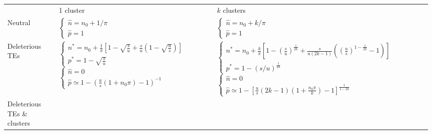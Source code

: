 \documentclass[10pt,a4paper]{article}
\begin{document}
\begin{table}
\begin{adjustwidth}{-2in}{0in}
\begin{flushright}
\begin{tabular}{p{3cm}p{6cm}p{7cm}}
 & 1 cluster & $k$ clusters \\
Neutral						& $\begin{cases} 
								\hat n = n_0 + 1/\pi \\ 
								\hat p = 1 
							\end{cases}$
							& $\begin{cases} 
								\hat n = n_0 + k/\pi \\ 
								\hat p = 1 
							\end{cases}$  \\
Deleterious TEs 			& $\begin{cases} 
								n^\ast = n_0 + \frac{1}{\pi}[1-\sqrt{\frac{s}{u}}+ \frac{s}{u}(1-\sqrt{\frac{u}{s}})] \\
								p^\ast = 1 - \sqrt{\frac{s}{u}} 
							\end{cases}$ 
							$\begin{cases}
								\hat n = 0 \\ 
								\hat p \simeq 1-(\frac{u}{s}(1+n_0\pi)-1)^{-1} 
							\end{cases}$
							& $\begin{cases} 
								n^\ast = n_0 + \frac{k}{\pi}[1 - (\frac{s}{u})^\frac{1}{2k} + \frac{s}{u(2k-1)} ((\frac{u}{s})^{1-\frac{1}{2k}} -1)] \\ 
								p^\ast = 1 - (s/u)^\frac{1}{2k}
							\end{cases}$ 
							$\begin{cases} 
								\hat n = 0 \\ 
								\hat p \simeq 1-[\frac{u}{s}(2k-1)(1+\frac{n_0 \pi}{k})-1]^\frac{1}{1-2k}
							\end{cases}$\\
Deleterious TEs \& clusters	& 
							& \\
\end{tabular}
\end{flushright}\end{adjustwidth}
\end{table}



\printbibliography
\end{document}
